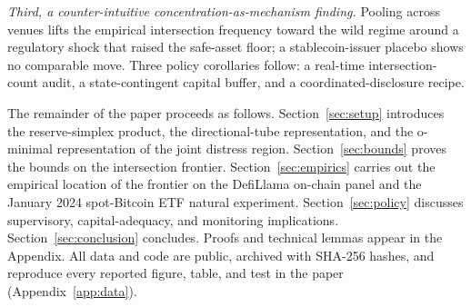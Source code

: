 \emph{Third, a counter-intuitive concentration-as-mechanism
finding.} Pooling across venues lifts the empirical intersection
frequency toward the wild regime around a regulatory shock that
raised the safe-asset floor; a stablecoin-issuer placebo shows no
comparable move. Three policy corollaries follow: a real-time
intersection-count audit, a state-contingent capital buffer, and
a coordinated-disclosure recipe.

The remainder of the paper proceeds as follows. Section~\ref{sec:setup}
introduces the reserve-simplex product, the directional-tube
representation, and the o-minimal representation of the joint
distress region. Section~\ref{sec:bounds} proves the bounds on the
intersection frontier. Section~\ref{sec:empirics} carries out the
empirical location of the frontier on the DefiLlama on-chain panel
and the January 2024 spot-Bitcoin ETF natural experiment.
Section~\ref{sec:policy} discusses supervisory, capital-adequacy,
and monitoring implications. Section~\ref{sec:conclusion} concludes.
Proofs and technical lemmas appear in the Appendix. All data and code
are public, archived with SHA-256 hashes, and reproduce every reported
figure, table, and test in the paper (Appendix~\ref{app:data}).

